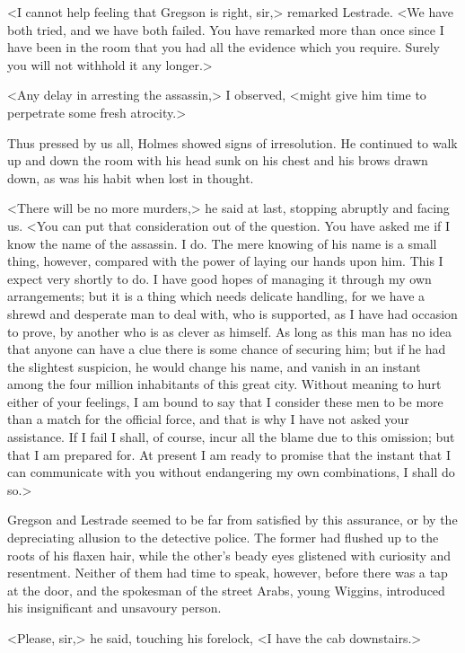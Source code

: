 <I cannot help feeling that Gregson is right, sir,> remarked Lestrade. <We have both tried, and we have both failed. You have remarked more than once since I have been in the room that you had all the evidence which you require. Surely you will not withhold it any longer.>

<Any delay in arresting the assassin,> I observed, <might give him time to perpetrate some fresh atrocity.>

Thus pressed by us all, Holmes showed signs of irresolution. He continued to walk up and down the room with his head sunk on his chest and his brows drawn down, as was his habit when lost in thought.

<There will be no more murders,> he said at last, stopping abruptly and facing us. <You can put that consideration out of the question. You have asked me if I know the name of the assassin. I do. The mere knowing of his name is a small thing, however, compared with the power of laying our hands upon him. This I expect very shortly to do. I have good hopes of managing it through my own arrangements; but it is a thing which needs delicate handling, for we have a shrewd and desperate man to deal with, who is supported, as I have had occasion to prove, by another who is as clever as himself. As long as this man has no idea that anyone can have a clue there is some chance of securing him; but if he had the slightest suspicion, he would change his name, and vanish in an instant among the four million inhabitants of this great city. Without meaning to hurt either of your feelings, I am bound to say that I consider these men to be more than a match for the official force, and that is why I have not asked your assistance. If I fail I shall, of course, incur all the blame due to this omission; but that I am prepared for. At present I am ready to promise that the instant that I can communicate with you without endangering my own combinations, I shall do so.>

Gregson and Lestrade seemed to be far from satisfied by this assurance, or by the depreciating allusion to the detective police. The former had flushed up to the roots of his flaxen hair, while the other's beady eyes glistened with curiosity and resentment. Neither of them had time to speak, however, before there was a tap at the door, and the spokesman of the street Arabs, young Wiggins, introduced his insignificant and unsavoury person.

<Please, sir,> he said, touching his forelock, <I have the cab downstairs.>

